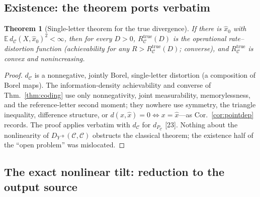 \documentclass[lettersize,onecolumn]{IEEEtran}
\newtheorem{theorem}{Theorem}
\theoremstyle{definition}
\theoremstyle{remark}
\newcommand{\PC}{P_{\mathcal{C}}}
\newcommand{\E}{\mathbb{E}}
\begin{document}
\subsection{Existence: the theorem ports verbatim}

\begin{theorem}[Single-letter theorem for the true divergence]\label{thm:B1}
If there is $\hat x_0$ with $\E\,d_{\mathcal{C}}(X,\hat x_0)^2<\infty$, then for every
$D>0$, $R_{\mathcal{C}}^{\mathrm{true}}(D)$ is the operational rate--distortion
function (achievability for any $R>R_{\mathcal{C}}^{\mathrm{true}}(D)$; converse), and
$R_{\mathcal{C}}^{\mathrm{true}}$ is convex and nonincreasing.
\end{theorem}
\begin{proof}
$d_{\mathcal{C}}$ is a nonnegative, jointly Borel, single-letter distortion (a
composition of Borel maps). The information-density achievability and converse of
Thm.~\ref{thm:coding} use only nonnegativity, joint measurability, memorylessness, and
the reference-letter second moment; they nowhere use symmetry, the triangle
inequality, difference structure, or $d(x,\hat x)=0\iff x=\hat x$---as
Cor.~\ref{cor:pointdep} records. The proof applies verbatim with $d_{\mathcal{C}}$ for
$d_{\PC}$ [23]. Nothing about the nonlinearity of
$D_Y\circ(\mathcal{C},\mathcal{C})$ obstructs the classical theorem; the existence half
of the ``open problem'' was mislocated.
\end{proof}

\subsection{The exact nonlinear tilt: reduction to the output source}
\end{document}
